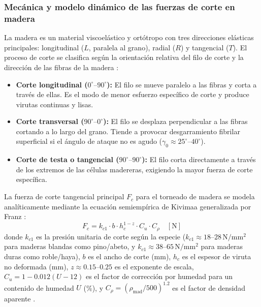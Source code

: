 \documentclass[12pt,a4paper]{article}
\begin{document}
\subsubsection{Mecánica y modelo dinámico de las fuerzas de corte en madera}
La madera es un material viscoelástico y ortótropo con tres direcciones elásticas principales: longitudinal ($L$, paralela al grano), radial ($R$) y tangencial ($T$). El proceso de corte se clasifica según la orientación relativa del filo de corte y la dirección de las fibras de la madera \cite{kivimaa1950, franz1958, eyma2004, naylor2012}:
\begin{itemize}[itemsep=2pt, topsep=2pt, parsep=0pt]
    \item \textbf{Corte longitudinal ($0^\circ\text{--}90^\circ$):} El filo se mueve paralelo a las fibras y corta a través de ellas. Es el modo de menor esfuerzo específico de corte y produce virutas continuas y lisas.
    \item \textbf{Corte transversal ($90^\circ\text{--}0^\circ$):} El filo se desplaza perpendicular a las fibras cortando a lo largo del grano. Tiende a provocar desgarramiento fibrilar superficial si el ángulo de ataque no es agudo ($\gamma_0 \approx 25^\circ\text{--}40^\circ$).
    \item \textbf{Corte de testa o tangencial ($90^\circ\text{--}90^\circ$):} El filo corta directamente a través de los extremos de las células madereras, exigiendo la mayor fuerza de corte específica.
\end{itemize}

La fuerza de corte tangencial principal $F_c$ para el torneado de madera se modela analíticamente mediante la ecuación semiempírica de Kivimaa generalizada por Franz \cite{kivimaa1950, franz1958}:
\begin{equation}
    F_c = k_{c1} \cdot b \cdot h_c^{1-z} \cdot C_u \cdot C_\rho \quad [\si{\newton}]
    \label{eq:kivimaa_madera}
\end{equation}
donde $k_{c1}$ es la presión unitaria de corte según la especie ($k_{c1} \approx 18\text{--}28\,\si{\newton\per\milli\meter\squared}$ para maderas blandas como pino/abeto, y $k_{c1} \approx 38\text{--}65\,\si{\newton\per\milli\meter\squared}$ para maderas duras como roble/haya), $b$ es el ancho de corte ($\si{\milli\meter}$), $h_c$ es el espesor de viruta no deformada ($\si{\milli\meter}$), $z \approx 0.15\text{--}0.25$ es el exponente de escala, $C_u = 1 - 0.012(U - 12)$ es el factor de corrección por humedad para un contenido de humedad $U$ (\%), y $C_\rho = (\rho_{\text{mad}} / 500)^{1.2}$ es el factor de densidad aparente \cite{eyma2004, naylor2012}.
\end{document}
